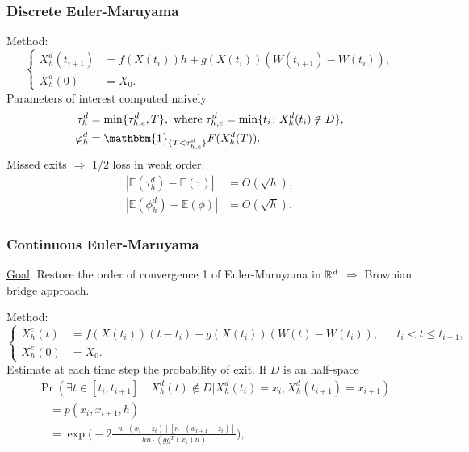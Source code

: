 \begin{frame}[plain]
\frametitle{Discrete Euler-Maruyama}
Method:
\begin{equation*}
	\left \{
	\begin{aligned}
		X_h^d(t_{i+1}) &= f(X(t_i))h + g(X(t_i))(W(t_{i+1}) - W(t_{i})),  \\
		X_h^d(0) &= X_0.
	\end{aligned} \right .
\end{equation*}
Parameters of interest computed naively
\begin{equation*}
\begin{aligned}
	\tau_h^d &= \min\{\tau_{h,e}^d,T\}, \text{ where } \tau_{h,e}^d = \min \{t_i \colon X_h^d(t_i) \notin D\}, \\
	\phi_h^d &= \mathbbm{1}_{\{T < \tau_{h,e}^d\}}F(X_h^d(T)).
\end{aligned}
\end{equation*}
Missed exits $\Rightarrow$ 1/2 loss in weak order:
\begin{align*}
	|\mathbb{E}(\tau_h^d) - \mathbb{E}(\tau)| &= O(\sqrt{h}), \\
	|\mathbb{E}(\phi_h^d) - \mathbb{E}(\phi)| &= O(\sqrt{h}).
\end{align*}	
\end{frame}

\begin{frame}[plain]
\frametitle{Continuous Euler-Maruyama}
\underline{Goal}. Restore the order of convergence 1 of Euler-Maruyama in $\mathbb{R}^d$ $\Rightarrow$ Brownian bridge approach.

Method:
\begin{equation*}
	\left \{
	\begin{aligned}
		X_h^c(t) &= f(X(t_i))(t-t_i) + g(X(t_i))(W(t) - W(t_{i})),  && t_i < t \leq t_{i+1},\\
		X_h^c(0) &= X_0.
	\end{aligned} \right .
\end{equation*} 
Estimate at each time step the probability of exit. If $D$ is an half-space
\begin{equation*}
\begin{aligned}
	&\Pr (\exists t \in [ t_i,t_{i+1} ] \quad X_h^d(t) \notin D | X_h^d(t_i) = x_i, X_h^d(t_{i+1}) = x_{i+1}) \\
	&\quad = p(x_i,x_{i+1},h) \\
	&\quad = \exp\Big(-2\frac{[n\cdot(x_i - z_i)][n\cdot(x_{i+1} - z_i)]}{hn\cdot (gg^T(x_i)n)}\Big),
\end{aligned}
\end{equation*}
\end{frame}

